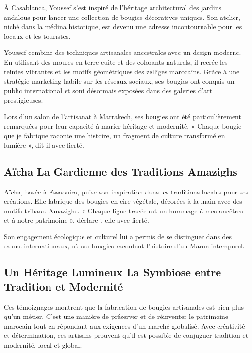 \documentclass[11pt,fleqn,onecolumn,oneside]{book}
\begin{document}
\begin{corollary}
À Casablanca, Youssef s’est inspiré de l’héritage architectural des jardins andalous pour lancer une collection de bougies décoratives uniques. Son atelier, niché dans la médina historique, est devenu une adresse incontournable pour les locaux et les touristes.
\end{corollary}

Youssef combine des techniques artisanales ancestrales avec un design moderne. En utilisant des moules en terre cuite et des colorants naturels, il recrée les teintes vibrantes et les motifs géométriques des zelliges marocains. Grâce à une stratégie marketing habile sur les réseaux sociaux, ses bougies ont conquis un public international et sont désormais exposées dans des galeries d’art prestigieuses.

\begin{example}
Lors d’un salon de l’artisanat à Marrakech, ses bougies ont été particulièrement remarquées pour leur capacité à marier héritage et modernité. « Chaque bougie que je fabrique raconte une histoire, un fragment de culture transformé en lumière », dit-il avec fierté.
\end{example}

\subsection*{Aïcha La Gardienne des Traditions Amazighs}

Aïcha, basée à Essaouira, puise son inspiration dans les traditions locales pour ses créations. Elle fabrique des bougies en cire végétale, décorées à la main avec des motifs tribaux Amazighs. « Chaque ligne tracée est un hommage à mes ancêtres et à notre patrimoine », déclare-t-elle avec fierté.

Son engagement écologique et culturel lui a permis de se distinguer dans des salons internationaux, où ses bougies racontent l’histoire d’un Maroc intemporel.

\subsection*{Un Héritage Lumineux La Symbiose entre Tradition et Modernité}

Ces témoignages montrent que la fabrication de bougies artisanales est bien plus qu’un métier. C’est une manière de préserver et de réinventer le patrimoine marocain tout en répondant aux exigences d’un marché globalisé. Avec créativité et détermination, ces artisans prouvent qu’il est possible de conjuguer tradition et modernité, local et global.
\end{document}
